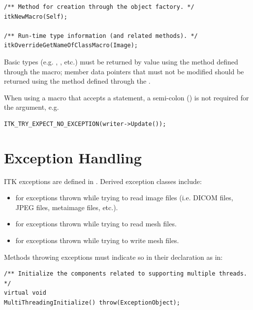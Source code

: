 \small
\begin{verbatim}
/** Method for creation through the object factory. */
itkNewMacro(Self);

/** Run-time type information (and related methods). */
itkOverrideGetNameOfClassMacro(Image);
\end{verbatim}
\normalsize

Basic types (e.g. , , etc.) must be returned by value
using the method defined through the  macro; member data
pointers that must not be modified should be returned using the method defined
through the .

When using a macro that accepts a statement, a semi-colon (\code{;}) is not
required for the argument, e.g.

\small
\begin{verbatim}
ITK_TRY_EXPECT_NO_EXCEPTION(writer->Update());
\end{verbatim}
\normalsize


\section{Exception Handling}%
\label{sec:ExceptionHandling}

ITK exceptions are defined in . Derived exception
classes include:
\begin{itemize}
\item {} for exceptions thrown while trying to
read image files (i.e. DICOM files, JPEG files, metaimage files, etc.).
\item {} for exceptions thrown while trying to
read mesh files.
\item {} for exceptions thrown while trying to
write mesh files.
\end{itemize}

Methods throwing exceptions must indicate so in their declaration as in:

\small
\begin{verbatim}
/** Initialize the components related to supporting multiple threads. */
virtual void
MultiThreadingInitialize() throw(ExceptionObject);
\end{verbatim}
\normalsize

